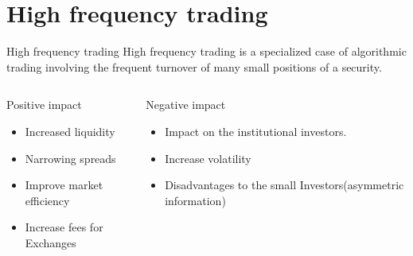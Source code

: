 \documentclass[xcolor={x11names,svgnames,dvipsnames}]{beamer}
\begin{document}
\section{High frequency trading}
\begin{frame}


\begin{block}{High frequency trading}
High frequency trading is a specialized case of algorithmic trading involving the \alert{frequent turnover} of many \alert{small positions} of a security.
\end{block}

\begin{columns}
\column{2.3in}
\begin{block}{Positive impact }
\begin{itemize}
\item Increased liquidity
\item Narrowing spreads
\item Improve market efficiency
\item Increase fees for Exchanges  
\end{itemize}
\end{block}

\column{2.3in}
\begin{block}{Negative impact }
\begin{itemize}
\item Impact on the institutional investors.
\item Increase volatility 
\item Disadvantages to the small Investors(\alert{asymmetric information})
\end{itemize}
\end{block}
\end{columns}

\end{frame}
\end{document}
